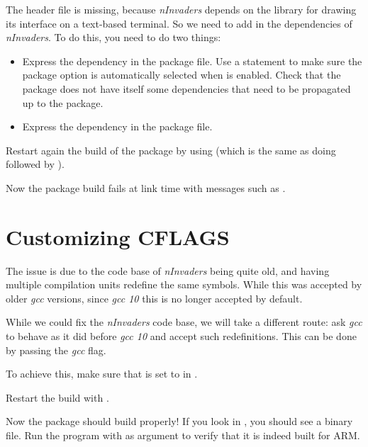 The  header file is missing, because {\em nInvaders}
depends on the  library for drawing its interface on a
text-based terminal. So we need to add  in the
dependencies of {\em nInvaders}. To do this, you need to do two
things:

\begin{itemize}

\item Express the dependency in the package  file. Use
  a  statement to make sure the  package
  option is automatically selected when  is
  enabled. Check that the  package does not have itself
  some dependencies that need to be propagated up to the
   package.

\item Express the dependency in the package  file.

\end{itemize}

Restart again the build of the package by using
 (which is the same as doing
 followed by ).

Now the package build fails at link time with messages such as
.

\section{Customizing CFLAGS}

The  issue is due to the code base of {\em
  nInvaders} being quite old, and having multiple compilation units
redefine the same symbols. While this was accepted by older {\em gcc}
versions, since {\em gcc 10} this is no longer accepted by default.

While we could fix the {\em nInvaders} code base, we will take a
different route: ask {\em gcc} to behave as it did before {\em gcc 10}
and accept such redefinitions. This can be done by passing the
 {\em gcc} flag.

To achieve this, make sure that  is set to
 in .

Restart the build with .

Now the package should build properly! If you look in
, you should see a
 binary file. Run the  program with
 as argument to verify that it is indeed built for
ARM.

